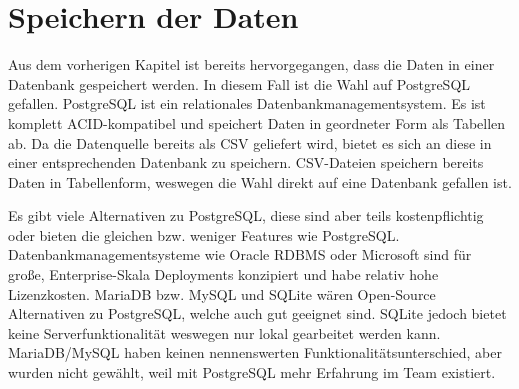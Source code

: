 \chapter{Speichern der Daten}

Aus dem vorherigen Kapitel ist bereits hervorgegangen, dass die Daten in einer Datenbank gespeichert werden.
In diesem Fall ist die Wahl auf PostgreSQL gefallen.
PostgreSQL ist ein relationales Datenbankmanagementsystem. Es ist komplett ACID-kompatibel und speichert Daten in geordneter Form als Tabellen ab.
Da die Datenquelle bereits als CSV geliefert wird, bietet es sich an diese in einer entsprechenden Datenbank zu speichern.
CSV-Dateien speichern bereits Daten in Tabellenform, weswegen die Wahl direkt auf eine Datenbank gefallen ist.

Es gibt viele Alternativen zu PostgreSQL, diese sind aber teils kostenpflichtig oder bieten die gleichen bzw. weniger Features wie PostgreSQL.
Datenbankmanagementsysteme wie Oracle RDBMS oder Microsoft sind für große, Enterprise-Skala Deployments konzipiert und habe relativ hohe Lizenzkosten.
MariaDB bzw. MySQL und SQLite wären Open-Source Alternativen zu PostgreSQL, welche auch gut geeignet sind.
SQLite jedoch bietet keine Serverfunktionalität weswegen nur lokal gearbeitet werden kann.
MariaDB/MySQL haben keinen nennenswerten Funktionalitätsunterschied, aber wurden nicht gewählt, weil mit PostgreSQL mehr Erfahrung im Team existiert.